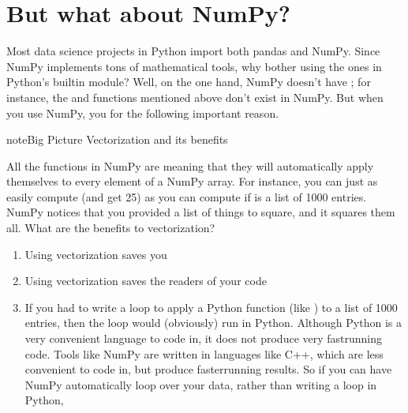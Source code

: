 \documentclass[letterpaper,10pt,english]{sphinxmanual}
\begin{document}
\section{But what about NumPy?}
\label{\detokenize{chapter-9-math-and-stats:but-what-about-numpy}}
Most data science projects in Python import both pandas and NumPy.  Since NumPy implements tons of mathematical tools, why bother using the ones in Python’s built\sphinxhyphen{}in  module?  Well, on the one hand, NumPy doesn’t have ; for instance, the  and  functions mentioned above don’t exist in NumPy.  But when you  use NumPy, you  for the following important reason.

\begin{sphinxadmonition}{note}{Big Picture \sphinxhyphen{} Vectorization and its benefits}

All the functions in NumPy are  meaning that they will automatically apply themselves to every element of a NumPy array.  For instance, you can just as easily compute  (and get 25) as you can compute  if  is a list of 1000 entries.  NumPy notices that you provided a list of things to square, and it squares them all.  What are the benefits to vectorization?
\begin{enumerate}
%
\item {} 
Using vectorization saves you 

\item {} 
Using vectorization saves the readers of your code 

\item {} 
If you had to write a loop to apply a Python function (like ) to a list of 1000 entries, then the loop would (obviously) run in Python.  Although Python is a very convenient language to code in, it does not produce very fast\sphinxhyphen{}running code.  Tools like NumPy are written in languages like C++, which are less convenient to code in, but produce faster\sphinxhyphen{}running results.  So if you can have NumPy automatically loop over your data, rather than writing a loop in Python, 

\end{enumerate}
\end{sphinxadmonition}
\end{document}

